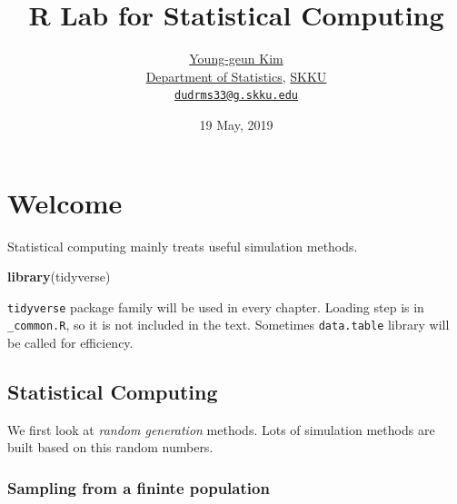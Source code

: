 \documentclass[]{book}
\title{R Lab for Statistical Computing}
\author{\href{https://github.com/ygeunkim}{Young-geun Kim}\\
\href{https://stat.skku.edu/stat/index.jsp}{Department of Statistics}, \href{https://www.skku.edu/skku/index.do}{SKKU}\\
\href{mailto:dudrms33@g.skku.edu}{\nolinkurl{dudrms33@g.skku.edu}}}
\date{19 May, 2019}
\newenvironment{Shaded}{\begin{snugshade}}{\end{snugshade}}
\newcommand{\KeywordTok}[1]{\textcolor[rgb]{0.13,0.29,0.53}{\textbf{#1}}}
\newcommand{\NormalTok}[1]{#1}
\let\oldmaketitle\maketitle
\theoremstyle{definition}
\theoremstyle{definition}
\theoremstyle{definition}
\theoremstyle{remark}
\begin{document}
\maketitle

\begin{titlepage}
  
\end{titlepage}

\let\maketitle\oldmaketitle
\maketitle

{
\setcounter{tocdepth}{1}
\tableofcontents
}
\hypertarget{welcome}{%
\chapter*{Welcome}\label{welcome}}

 Statistical computing mainly treats useful simulation methods.

\begin{Shaded}
\begin{Highlighting}[]
\KeywordTok{library}\NormalTok{(tidyverse)}
\end{Highlighting}
\end{Shaded}

\texttt{tidyverse} package family will be used in every chapter. Loading step is in \texttt{\_common.R}, so it is not included in the text. Sometimes \texttt{data.table} library will be called for efficiency.

\hypertarget{statistical-computing}{%
\section*{Statistical Computing}\label{statistical-computing}}

We first look at \emph{random generation} methods. Lots of simulation methods are built based on this random numbers.

\hypertarget{sampling-from-a-fininte-population}{%
\subsection*{Sampling from a fininte population}\label{sampling-from-a-fininte-population}}
\end{document}
